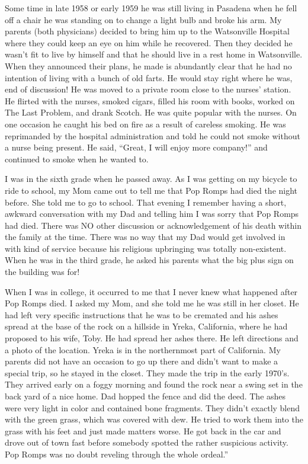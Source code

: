 \documentclass{article}
\begin{document}
Some time in late 1958  or early 1959 he was still living in Pasadena when he fell off a chair he was standing on to
change a light bulb and broke his arm. My parents (both physicians) decided to bring him up to the Watsonville Hospital
where they could keep an eye on him while he recovered. Then they decided he wasn’t fit to live by himself and that he
should live in a rest home in Watsonville. When they announced their plans, he made is abundantly clear that he had no
intention of living with a bunch of old farts. He would stay right where he was, end of discussion! He was moved to a
private room close to the nurses’ station. He flirted with the nurses, smoked cigars, filled his room with books,
worked on The Last Problem, and drank Scotch. He was quite popular with the nurses. On one occasion he caught his bed
on fire as a result of careless smoking. He was reprimanded by the hospital administration and told he could not smoke
without a nurse being present. He said, “Great, I will enjoy more company!” and continued to smoke when he wanted to. 

I was in the sixth grade when he passed away. As I was getting on my bicycle to ride to school, my Mom came out to tell
me that Pop Romps had died the night before. She told me to go to school. That evening I remember having a short,
awkward conversation with my Dad and telling him I was sorry that Pop Romps had died. There was NO other discussion or
acknowledgement of his death within the family at the time. There was no way that my Dad would get involved in with
kind of service because his religious upbringing was totally non-existent. When he was in the third grade, he asked his
parents what the big plus sign on the building was for! 

When I was in college, it occurred to me that I never knew what happened after Pop Romps died. I asked my Mom, and she
told me he was still in her closet. He had left very specific instructions that he was to be cremated and his ashes
spread at the base of the rock on a hillside in Yreka, California, where he had proposed to his wife, Toby. He had
spread her ashes there. He left directions and a photo of the location. Yreka is in the northernmost part of
California. My parents did not have an occasion to go up there and didn’t want to make a special trip, so he stayed in
the closet. They made the trip in the early 1970’s. They arrived early on a foggy morning and found the rock near a
swing set in the back yard of a nice home. Dad hopped the fence and did the deed. The ashes were very light in color
and contained bone fragments. They didn’t exactly blend with the green grass, which was covered with dew. He tried to
work them into the grass with his feet and just made matters worse. He got back in the car and drove out of town fast
before somebody spotted the rather suspicious activity. Pop Romps was no doubt reveling through the whole ordeal.”
\end{document}
